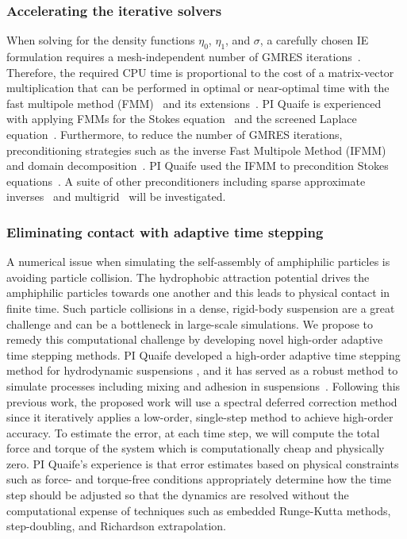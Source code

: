 \subsubsection{Accelerating the iterative solvers}
\label{subsec:NumericalIssues}

When solving for the density functions $\eta_0$, $\eta_1$, and $\sigma$,
a carefully chosen IE formulation requires a mesh-independent number of
GMRES iterations~\cite{cam-ips-kel-mey-xue1996}. Therefore, the required
CPU time is proportional to the cost of a matrix-vector multiplication
that can be performed in optimal or near-optimal time with the fast
multipole method (FMM)~\cite{fmm5} and its extensions~\cite{fmm1, fmm2,
fmm3, fmm4, fmm6, fmm7, fmm8}. PI Quaife is experienced with applying
FMMs for the Stokes equation~\cite{qua-bir2014, bys-sha-qua2020} and the
screened Laplace equation~\cite{kro-qua2011, qua2011}. Furthermore, to
reduce the number of GMRES iterations, preconditioning strategies such
as the inverse Fast Multipole Method (IFMM)~\cite{cou-pou-dar2017} and
domain decomposition~\cite{che-bir2021}. PI Quaife used the IFMM to
precondition Stokes equations~\cite{qua-cou-dar2018}. A suite of other
preconditioners including sparse approximate inverses~\cite{che2000} and
multigrid~\cite{hem-sch1981, sch1982} will be investigated.


\subsubsection{Eliminating contact with adaptive time stepping}
\label{subsec:timeStepping}

A numerical issue when simulating the self-assembly of amphiphilic
particles is avoiding particle collision. The hydrophobic attraction
potential drives the amphiphilic particles towards one another and this
leads to physical contact in finite time. Such particle collisions in a
dense, rigid-body suspension are a great challenge and can be a
bottleneck in large-scale simulations. We propose to remedy this
computational challenge by developing novel high-order adaptive time
stepping methods. PI Quaife developed a high-order adaptive time
stepping method for hydrodynamic suspensions \cite{qua-bir2016}, and it
has served as a robust method to simulate processes including mixing and
adhesion in suspensions~\cite{qua-vee-you2019, kab-qua-bir2017}.
Following this previous work, the proposed work will use a spectral
deferred correction method~\cite{dut-gre-rok2000} since it iteratively
applies a low-order, single-step method to achieve high-order accuracy.
To estimate the error, at each time step, we will compute the total
force and torque of the system which is computationally cheap and
physically zero. PI Quaife's experience is that error estimates based on
physical constraints such as force- and torque-free conditions
appropriately determine how the time step should be adjusted so that the
dynamics are resolved without the computational expense of techniques
such as embedded Runge-Kutta methods, step-doubling, and Richardson
extrapolation.


